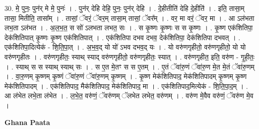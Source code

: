 \documentclass[17pt]{extarticle}
\begin{document}
30. मे॒ पुनः॒ पुन॑र् मे मे॒ पुनः॑ । . पुन॑र् देहि देहि॒ पुनः॒ पुन॑र् देहि । . दे॒हीतीति॑ देहि दे॒हीति॑ । . इति॒ तासा॒म् तासा॒ मितीति॒ तासा᳚म् । . तासां॒ ॅवरं॒ ॅवर॒म् तासा॒म् तासां॒ ॅवर᳚म् । . वर॒ मा वरं॒ ॅवर॒ मा । . आ ऽल॑भता लभ॒ता ऽल॑भत । . अ॒ल॒भ॒त॒ स सो॑ ऽलभता लभत॒ सः । . स कृ॒ष्णः कृ॒ष्णः स स कृ॒ष्णः । . कृ॒ष्ण एक॑शितिपा॒ देक॑शितिपात् कृ॒ष्णः कृ॒ष्ण एक॑शितिपात् । . एक॑शितिपा दभव दभव॒ देक॑शितिपा॒ देक॑शितिपा दभवत् । . एक॑शितिपा॒दित्येक॑ - शि॒ति॒पा॒त् । . अ॒भ॒व॒द् यो यो॑ ऽभव दभव॒द् यः । . यो वरु॑णगृहीतो॒ वरु॑णगृहीतो॒ यो यो वरु॑णगृहीतः । . वरु॑णगृहीतः॒ स्याथ् स्याद् वरु॑णगृहीतो॒ वरु॑णगृहीतः॒ स्यात् । . वरु॑णगृहीत॒ इति॒ वरु॑ण - गृ॒ही॒तः॒ । . स्याथ् स स स्याथ् स्याथ् सः । . स ए॒त मे॒तꣳ स स ए॒तम् । . ए॒तं ॅवा॑रु॒णं ॅवा॑रु॒ण मे॒त मे॒तं ॅवा॑रु॒णम् । . वा॒रु॒णम् कृ॒ष्णम् कृ॒ष्णं ॅवा॑रु॒णं ॅवा॑रु॒णम् कृ॒ष्णम् । . कृ॒ष्ण मेक॑शितिपाद॒ मेक॑शितिपादम् कृ॒ष्णम् कृ॒ष्ण मेक॑शितिपादम् । . एक॑शितिपाद॒ मैक॑शितिपाद॒ मेक॑शितिपाद॒ मा । . एक॑शितिपाद॒मित्येक॑ - शि॒ति॒पा॒द॒म् । . आ ल॑भेत लभे॒ता ल॑भेत । . ल॒भे॒त॒ वरु॑णं॒ ॅवरु॑णम् ॅलभेत लभेत॒ वरु॑णम् । . वरु॑ण मे॒वैव वरु॑णं॒ ॅवरु॑ण मे॒व । \newline

\textbf{Ghana Paata } \newline
\end{document}
